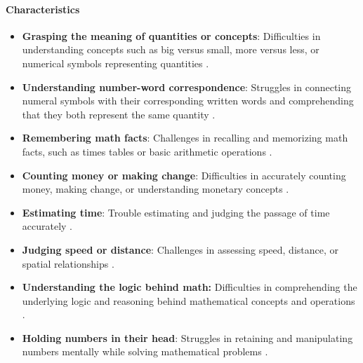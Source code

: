 \paragraph{Characteristics}
\begin{itemize}
    \item \textbf{Grasping the meaning of quantities or concepts}: Difficulties in understanding concepts such as big versus small, more versus less, or numerical symbols representing quantities \cite{understood2024}.
    \item \textbf{Understanding number-word correspondence}: Struggles in connecting numeral symbols with their corresponding written words and comprehending that they both represent the same quantity \cite{understood2024}.
    \item \textbf{Remembering math facts}: Challenges in recalling and memorizing math facts, such as times tables or basic arithmetic operations \cite{clevelandclinic2024}.
    \item \textbf{Counting money or making change}: Difficulties in accurately counting money, making change, or understanding monetary concepts \cite{understood2024}.
    \item \textbf{Estimating time}: Trouble estimating and judging the passage of time accurately \cite{understood2024}.
    \item \textbf{Judging speed or distance}: Challenges in assessing speed, distance, or spatial relationships \cite{pmc2024}.
    \item \textbf{Understanding the logic behind math:} Difficulties in comprehending the underlying logic and reasoning behind mathematical concepts and operations \cite{understood2024}.
    \item \textbf{Holding numbers in their head}: Struggles in retaining and manipulating numbers mentally while solving mathematical problems \cite{understood2024}.
\end{itemize}

